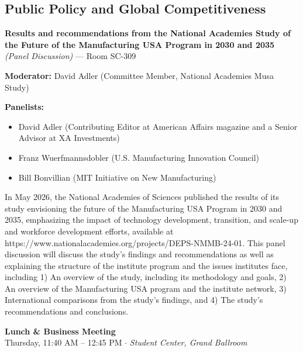 \documentclass[
  10pt,
  letterpaper,
  DIV=11,
  numbers=noendperiod]{scrartcl}
\providecommand{\tightlist}{%
  \setlength{\itemsep}{0pt}\setlength{\parskip}{0pt}}\usepackage{longtable,booktabs,array}
\begin{document}
\subsection{\texorpdfstring{\textcolor{policy}{Public Policy and Global Competitiveness}}{}}\label{section-30}

\textbf{Results and recommendations from the National Academies Study of
the Future of the Manufacturing USA Program in 2030 and 2035}
\emph{(Panel Discussion)} --- Room SC-309

\textbf{Moderator:} David Adler (Committee Member, National Academies
Musa Study)

\textbf{Panelists:}

\begin{itemize}
\tightlist
\item
  David Adler (Contributing Editor at American Affairs magazine and a
  Senior Advisor at XA Investments)
\item
  Franz Wuerfmannsdobler (U.S. Manufacturing Innovation Council)
\item
  Bill Bonvillian (MIT Initiative on New Manufacturing)
\end{itemize}

In May 2026, the National Academies of Sciences published the results of
its study envisioning the future of the Manufacturing USA Program in
2030 and 2035, emphasizing the impact of technology development,
transition, and scale-up and workforce development efforts, available at
https://www.nationalacademies.org/projects/DEPS-NMMB-24-01. This panel
discussion will discuss the study's findings and recommendations as well
as explaining the structure of the institute program and the issues
institutes face, including 1) An overview of the study, including its
methodology and goals, 2) An overview of the Manufacturing USA program
and the institute network, 3) International comparisons from the study's
findings, and 4) The study's recommendations and conclusions.

\vspace{1em}


\begin{center}
\colorbox{event!15}{\parbox{0.9\linewidth}{\centering
  \textcolor{event}{\large\textbf{Lunch \& Business Meeting}}\\[2pt]
  {\small Thursday, 11:40 AM – 12:45 PM $\cdot$ \textit{Student Center, Grand Ballroom}}
}}
\end{center}
\end{document}

